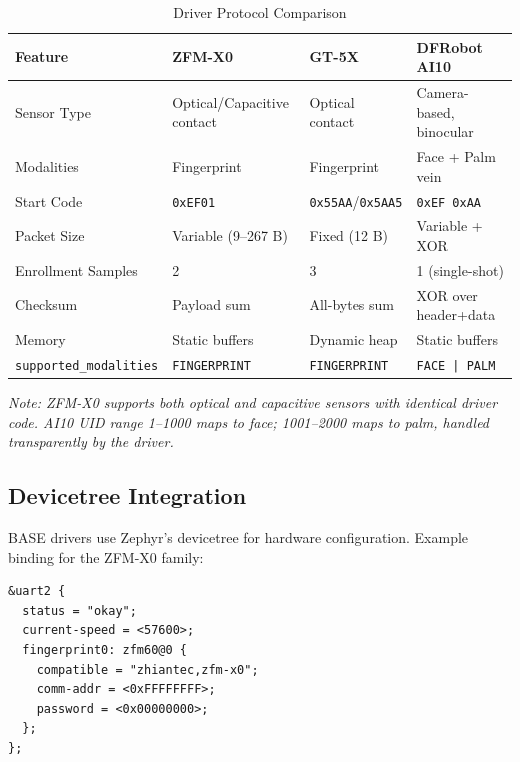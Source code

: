 \begin{table}[!ht]
\caption{Driver Protocol Comparison}
\label{tab:protocol_comparison}
\centering
\renewcommand{\arraystretch}{1.2}
\setlength{\tabcolsep}{4pt}
\begin{tabularx}{\textwidth}{|l|X|X|X|}
\hline
\textbf{Feature} & \textbf{ZFM-X0} & \textbf{GT-5X} & \textbf{DFRobot AI10} \\
\hline
Sensor Type & Optical/Capacitive contact & Optical contact & Camera-based, binocular \\
\hline
Modalities & Fingerprint & Fingerprint & Face + Palm vein \\
\hline
Start Code & \texttt{0xEF01} & \texttt{0x55AA}/\texttt{0x5AA5} & \texttt{0xEF 0xAA} \\
\hline
Packet Size & Variable (9--267 B) & Fixed (12 B) & Variable + XOR \\
\hline
Enrollment Samples & 2 & 3 & 1 (single-shot) \\
\hline
Checksum & Payload sum & All-bytes sum & XOR over header+data \\
\hline
Memory & Static buffers & Dynamic heap & Static buffers \\
\hline
\texttt{supported\_modalities} & \texttt{FINGERPRINT} & \texttt{FINGERPRINT} & \texttt{FACE | PALM} \\
\hline
\end{tabularx}
\smallskip
\par\noindent\footnotesize\textit{Note: ZFM-X0 supports both optical and capacitive sensors with identical driver code. AI10 UID range 1--1000 maps to face; 1001--2000 maps to palm, handled transparently by the driver.}
\end{table}

\subsection{Devicetree Integration}

BASE drivers use Zephyr's devicetree for hardware configuration. Example binding for the ZFM-X0 family:

\begin{small}
\begin{verbatim}
&uart2 {
  status = "okay";
  current-speed = <57600>;
  fingerprint0: zfm60@0 {
    compatible = "zhiantec,zfm-x0";
    comm-addr = <0xFFFFFFFF>;
    password = <0x00000000>;
  };
};
\end{verbatim}
\end{small}

